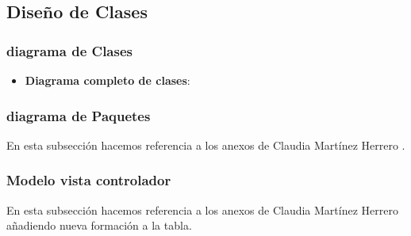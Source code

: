 \subsection{Diseño de Clases}

\subsubsection{diagrama de Clases}

\begin{itemize}
	\tightlist
	\item
	\textbf{Diagrama completo de clases}:
	
	
	
\end{itemize}

\subsubsection{diagrama de Paquetes}

En esta subsección hacemos referencia a los anexos de Claudia Martínez Herrero \cite{claudia:anexo}.

\subsubsection{Modelo vista controlador}

En esta subsección hacemos referencia a los anexos de Claudia Martínez Herrero \cite{claudia:anexo} añadiendo nueva formación a la tabla.

